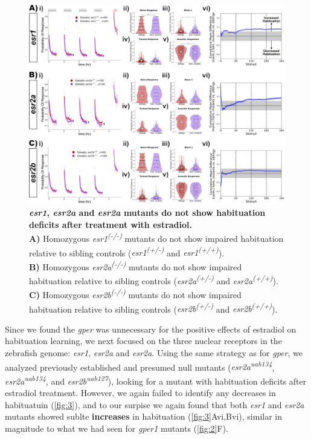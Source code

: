 \documentclass[9pt,lineno]{RandlettLab_elife}
\begin{document}
{\begin{figure}
\begin{fullwidth}
\begin{center}
\includegraphics[width=0.95\linewidth]{figures/NuclearSingleMutants.png}
\caption{\textbf{\emph{esr1}, \emph{esr2a} and \emph{esr2a} mutants do not show habituation deficits after treatment with estradiol.}
\\ \textbf{A)} Homozygous \emph{esr1\textsuperscript{(-/-)}} mutants do not show impaired habituation relative to sibling controls (\emph{esr1\textsuperscript{(+/-)}} and \emph{esr1\textsuperscript{(+/+)}}). 
\\ \textbf{B)} Homozygous \emph{esr2a\textsuperscript{(-/-)}} mutants do not show impaired habituation relative to sibling controls (\emph{esr2a\textsuperscript{(+/-)}} and \emph{esr2a\textsuperscript{(+/+)}}).
\\ \textbf{C)} Homozygous \emph{esr2b\textsuperscript{(-/-)}} mutants do not show impaired habituation relative to sibling controls (\emph{esr2b\textsuperscript{(+/-)}} and \emph{esr2b\textsuperscript{(+/+)}}). 
}
\label{fig:3}

\end{center}
\end{fullwidth}
\end{figure}

Since we found the \emph{gper} was unnecessary for the positive effects of estradiol on habituation learning, we next focused on the three nuclear receptors in the zebrafish genome: \emph{esr1}, \emph{esr2a} and \emph{esr2a}. Using the same strategy as for \emph{gper}, we analyzed previously established and presumed null mutants (\emph{esr2a\textsuperscript{uab134}}, \emph{esr2a\textsuperscript{uab134}}, and \emph{esr2b\textsuperscript{uab127}}), looking for a mutant with habituation deficits after estradiol treatment. However, we again failed to identify any decreases in habituatuin (\autoref{fig:3}), and to our surpise we again found that both \emph{esr1} and \emph{esr2a} mutants showed sublte \textbf{increases} in habituation (\autoref{fig:3}Avi,Bvi), similar in magnitude to what we had seen for \emph{gper1} mutants (\autoref{fig:2}F). 

}
\end{document}
